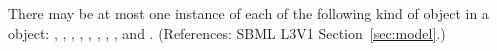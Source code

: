 There may be at most one instance of each of the following kind of object
in a \Model object: {\ListOfFunctionDefinitions,
\ListOfUnitDefinitions, \ListOfCompartments, \ListOfSpecies,
\ListOfParameters, \ListOfInitialAssignments, \ListOfRules,
\ListOfConstraints, \ListOfReactions} and
{\ListOfEvents}. (References: SBML L3V1
Section~\ref{sec:model}.)
